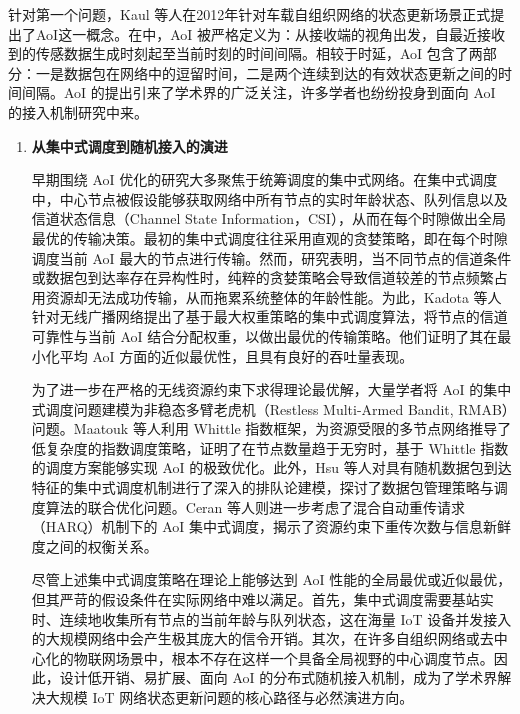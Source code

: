 针对第一个问题，Kaul 等人在2012年针对车载自组织网络的状态更新场景正式提出了AoI这一概念\cite{kaul2012real}。在\cite{kaul2012real}中，AoI 被严格定义为：从接收端的视角出发，自最近接收到的传感数据生成时刻起至当前时刻的时间间隔。相较于时延，AoI 包含了两部分：一是数据包在网络中的逗留时间，二是两个连续到达的有效状态更新之间的时间间隔。AoI 的提出引来了学术界的广泛关注，许多学者也纷纷投身到面向 AoI 的接入机制研究中来。

\begin{enumerate}[wide]
    \item \textbf{从集中式调度到随机接入的演进}
    
    早期围绕 AoI 优化的研究大多聚焦于统筹调度的集中式网络。在集中式调度中，中心节点被假设能够获取网络中所有节点的实时年龄状态、队列信息以及信道状态信息（Channel State Information，CSI），从而在每个时隙做出全局最优的传输决策。最初的集中式调度往往采用直观的贪婪策略，即在每个时隙调度当前 AoI 最大的节点进行传输。然而，研究表明，当不同节点的信道条件或数据包到达率存在异构性时，纯粹的贪婪策略会导致信道较差的节点频繁占用资源却无法成功传输，从而拖累系统整体的年龄性能。为此，Kadota 等人针对无线广播网络提出了基于最大权重策略的集中式调度算法，将节点的信道可靠性与当前 AoI 结合分配权重，以做出最优的传输策略。他们证明了其在最小化平均 AoI 方面的近似最优性，且具有良好的吞吐量表现\cite{kadota2018scheduling}。

    为了进一步在严格的无线资源约束下求得理论最优解，大量学者将 AoI 的集中式调度问题建模为非稳态多臂老虎机（Restless Multi-Armed Bandit, RMAB）问题\cite{sun2017update}。Maatouk 等人利用 Whittle 指数框架，为资源受限的多节点网络推导了低复杂度的指数调度策略，证明了在节点数量趋于无穷时，基于 Whittle 指数的调度方案能够实现 AoI 的极致优化\cite{maatouk2020optimality}。此外，Hsu 等人对具有随机数据包到达特征的集中式调度机制进行了深入的排队论建模，探讨了数据包管理策略与调度算法的联合优化问题\cite{hsu2019scheduling}。Ceran 等人则进一步考虑了混合自动重传请求（HARQ）机制下的 AoI 集中式调度，揭示了资源约束下重传次数与信息新鲜度之间的权衡关系\cite{ceran2019average}。

    尽管上述集中式调度策略在理论上能够达到 AoI 性能的全局最优或近似最优，但其严苛的假设条件在实际网络中难以满足。首先，集中式调度需要基站实时、连续地收集所有节点的当前年龄与队列状态，这在海量 IoT 设备并发接入的大规模网络中会产生极其庞大的信令开销。其次，在许多自组织网络或去中心化的物联网场景中，根本不存在这样一个具备全局视野的中心调度节点\cite{chen2021real}。因此，设计低开销、易扩展、面向 AoI 的分布式随机接入机制，成为了学术界解决大规模 IoT 网络状态更新问题的核心路径与必然演进方向。


\end{enumerate}

